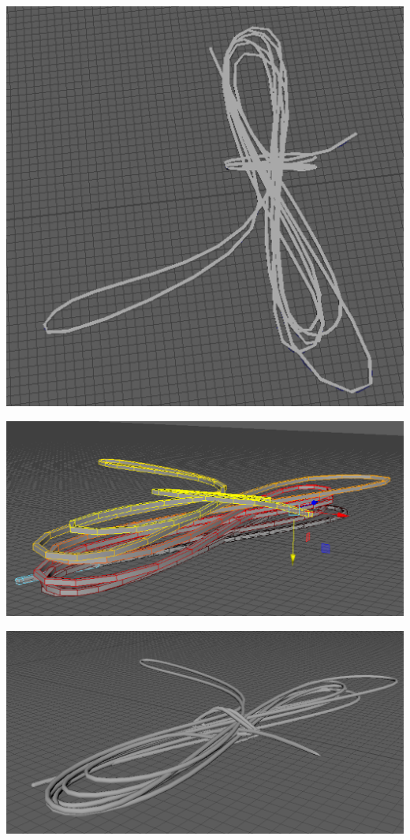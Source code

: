\documentclass[a4paper, openright, twoside]{book}
\begin{document}
\begin{minipage}{\textwidth}
\begin{center}
\begin{minipage}{0.18\textwidth}
    \end{minipage}\hfill
    \begin{minipage}{0.18\textwidth}
        \centering
        \includegraphics[width=1\textwidth]{images/towextrude.png}
    \end{minipage}\hfill
        \centering
    \begin{minipage}{0.18\textwidth}
        \centering
        \includegraphics[width=1\textwidth]{images/towsoft.png}
    \end{minipage}\hfill
    \begin{minipage}{0.18\textwidth}
        \centering
        \includegraphics[width=1\textwidth]{images/towdivisions.png}

\end{minipage}
\end{center}
\end{minipage}
\end{document}
